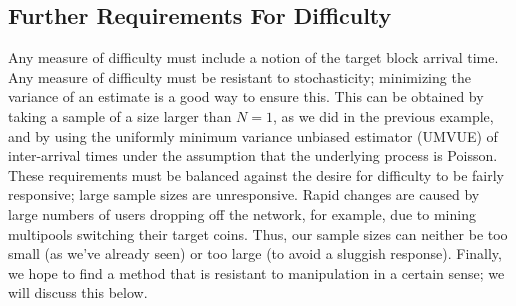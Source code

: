 \documentclass[12pt,english]{mrl}
\theoremstyle{definition}
\numberwithin{equation}{section}
\numberwithin{figure}{section}
\numberwithin{equation}{section}
\numberwithin{equation}{section}
\numberwithin{figure}{section}
\begin{document}
\subsection{Further Requirements For Difficulty}
Any measure of difficulty must include a notion of the target block arrival time. Any measure of difficulty must be resistant to stochasticity; minimizing the variance of an estimate is a good way to ensure this. This can be obtained by taking a sample of a size larger than $N=1$, as we did in the previous example, and by using the uniformly minimum variance unbiased estimator (UMVUE) of inter-arrival times under the assumption that the underlying process is Poisson. These requirements must be balanced against the desire for difficulty to be fairly responsive; large sample sizes are unresponsive. Rapid changes are caused by large numbers of users dropping off the network, for example, due to mining multipools switching their target coins. Thus, our sample sizes can neither be too small (as we've already seen) or too large (to avoid a sluggish response).  Finally, we hope to find a method that is resistant to manipulation in a certain sense; we will discuss this below.
\end{document}
